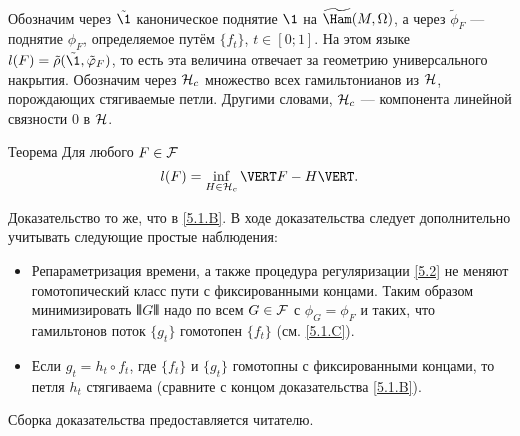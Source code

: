 Обозначим через $\tilde\1$ каноническое поднятие $\1$ на
$\widetilde\Ham(M, \Omega)$, а через 
$\tilde\phi_F$ — поднятие $\phi_F$, определяемое путём $\{f_t\}$, $t
\in [0; 1]$. 
На этом языке $l (F) = \tilde\rho (\tilde\1, \tilde\phi_F)$, то есть
эта величина отвечает за геометрию универсального накрытия. 
Обозначим через $\mathcal{H}_c$ множество всех гамильтонианов из $\mathcal{H}$,
порождающих стягиваемые петли. 
Другими словами, $\mathcal{H}_c$ — компонента линейной связности $0$ в $\mathcal{H}$.

\begin{thm}{Теорема}\label{5.3.A}
Для любого $F \in \mathcal{F}$ 
\[l (F) = \inf_{H\in\H_c} \VERT F - H \VERT.\]
\end{thm}

Доказательство то же, что в \ref{5.1.B}.
В ходе доказательства следует дополнительно учитывать следующие простые наблюдения:
\begin{itemize}
\item Репараметризация времени, а также процедура регуляризации \ref{5.2} не меняют гомотопический класс пути с фиксированными концами.
Таким образом минимизировать $\VERT G \VERT$ надо по всем $G \z\in \F$ с $\phi_G = \phi_F$ и таких, что гамильтонов поток $\{g_t\}$ гомотопен $\{f_t\}$ (см. \ref{5.1.C}).
\item Если $g_t = h_t \circ f_t$, где $\{f_t\}$ и $\{g_t\}$ гомотопны с фиксированными концами, то петля $h_t$ стягиваема (сравните с концом доказательства \ref{5.1.B}).
\end{itemize}
Сборка доказательства предоставляется читателю.
